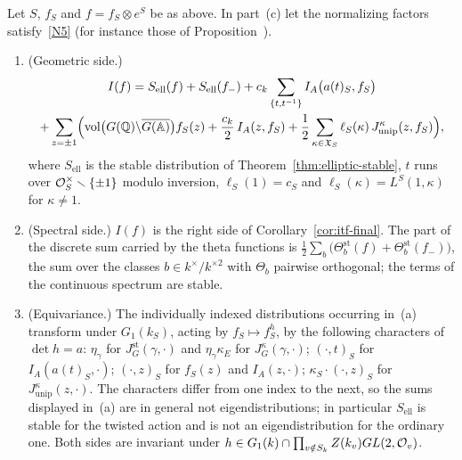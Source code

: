 \begin{theorem}\label{thm:stabler}
Let $S$, $f_S$ and $f=f_S\otimes e^S$ be as above. In part~(c) let the
normalizing factors satisfy~\ref{N5} (for instance those of
Proposition~\normref{}).
\begin{enumerate}[label=(\alph*)]
\item (Geometric side.)
  \begin{multline*}
  I(f)=S_{\mathrm{ell}}(f)+S_{\mathrm{ell}}(f_-)
  +c_k\sum_{\{t,t^{-1}\}}I_A\bigl(a(t)_S,f_S\bigr)\\
  +\sum_{z=\pm1}\Bigl(\operatorname{vol}\bigl(G(\mathbb{Q})\backslash\overline{G(\mathbb{A})}\bigr)f_S(z)+
  \frac{c_k}2\,I_A(z,f_S)+\frac12\sum_{\kappa\in\mathfrak X_S}
  \ell_S(\kappa)\,J^\kappa_{\mathrm{unip}}(z,f_S)\Bigr),
  \end{multline*}
  where $S_{\mathrm{ell}}$ is the stable distribution of
  Theorem~\ref{thm:elliptic-stable}, $t$ runs over $\mathcal{O}_S^\times
  \smallsetminus\{\pm1\}$ modulo inversion, $\ell_S(1)=c_S$ and
  $\ell_S(\kappa)=L^S(1,\kappa)$ for $\kappa\ne1$.
\item (Spectral side.) $I(f)$ is the right side of
  Corollary~\ref{cor:itf-final}. The part of the discrete sum carried by
  the theta functions is $\frac12\sum_b\bigl(\Theta^{\mathrm{st}}_b(f)+
  \Theta^{\mathrm{st}}_b(f_-)\bigr)$, the sum over the classes $b\in k^\times/
  k^{\times2}$ with $\Theta_b$ pairwise orthogonal; the terms of the
  continuous spectrum are stable.
\item (Equivariance.) The individually indexed distributions occurring
  in~(a) transform under $G_1(k_S)$, acting by $f_S\mapsto f_S^h$, by the
  following characters of $\det h=a$: $\eta_\gamma$ for $J^{\mathrm{st}}_G(\gamma,\cdot)$ and
  $\eta_\gamma\kappa_E$ for $J^\kappa_G(\gamma,\cdot)$; $(\cdot,t)_S$ for
  $I_A(a(t)_S,\cdot)$; $(\cdot,z)_S$ for $f_S(z)$ and $I_A(z,\cdot)$;
  $\kappa_S\cdot(\cdot,z)_S$ for $J^\kappa_{\mathrm{unip}}(z,\cdot)$. The
  characters differ from one index to the next, so the sums displayed
  in~(a) are in general not eigendistributions; in particular
  $S_{\mathrm{ell}}$ is stable for the twisted action and is not an
  eigendistribution for the ordinary one. Both
  sides are invariant under $h\in G_1(k)\cap\prod_{v\notin S_k}
  Z(k_v)GL(2,\mathcal{O}_v)$.
\end{enumerate}
\end{theorem}

